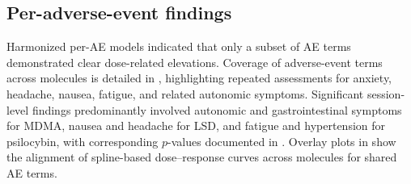 \subsection{Per-adverse-event findings}
Harmonized per-AE models indicated that only a subset of AE terms demonstrated clear dose-related elevations. Coverage of adverse-event terms across molecules is detailed in , highlighting repeated assessments for anxiety, headache, nausea, fatigue, and related autonomic symptoms. Significant session-level findings predominantly involved autonomic and gastrointestinal symptoms for MDMA, nausea and headache for LSD, and fatigue and hypertension for psilocybin, with corresponding $p$-values documented in . Overlay plots in  show the alignment of spline-based dose--response curves across molecules for shared AE terms.



